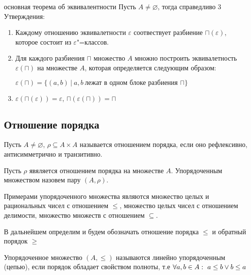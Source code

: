 \begin{theorem}{основная теорема об эквивалентности}
    Пусть $A \neq \varnothing$, тогда справедливо 3 Утверждения:
    \begin{enumerate}
        \item Каждому отношению эквивалетности $\varepsilon$ соотвествует
        разбиение $\sqcap(\varepsilon)$, которое состоит из $\varepsilon$"=классов.
        \item Для каждого разбиения $\sqcap$ множество $A$ множно построить эквивалетность
        $\varepsilon(\sqcap)$ на множестве $A$, которая определяется следующим образом:
        
        $\varepsilon(\sqcap) = \{(a, b) ~|~ a, b ~ \text{лежат в одном блоке разбиения }\sqcap \}$
        \item $\varepsilon(\sqcap(\varepsilon)) = \varepsilon$, $\sqcap(\varepsilon(\sqcap)) = \sqcap$
    \end{enumerate}

\end{theorem}

\subsection{Отношение порядка}

\begin{definition}
    Пусть $A \neq \varnothing$, $\rho \subseteq A \times A$ называется отношением 
порядка, если оно рефлексивно, антисимметрично и транзитивно.
\end{definition}

\begin{definition}
    Пусть $\rho$ явяляется отношением порядка на множестве $A$. Упорядоченным множеством назовем пару $(A, \rho)$.
\end{definition}

Примерами упорядоченного множества являются множество целых и рациональных
чисел с отношением $\leq$, множество целых чисел с отношением делимости,
множество множеств с отношением $\subseteq$.

В дальнейшем определим и будем обозначать отношение порядка $\leq$ и обратный
порядок $\geq$

\begin{definition}
    Упорядоченное множество $(A, \leq)$ называются линейно упорядоченным (цепью),
если порядок обладает свойством полноты, т.е $\forall a, b \in A : ~ a \leq b \vee b \leq a$
\end{definition}

